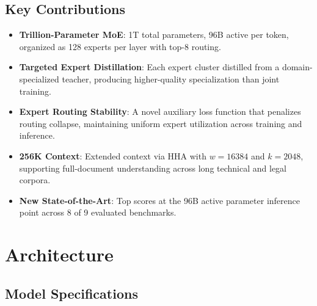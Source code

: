 \documentclass[11pt,a4paper]{article}
\begin{document}
\subsection{Key Contributions}

\begin{itemize}
    \item \textbf{Trillion-Parameter MoE}: 1T total parameters, 96B active per token,
    organized as 128 experts per layer with top-8 routing.
    \item \textbf{Targeted Expert Distillation}: Each expert cluster distilled from a
    domain-specialized teacher, producing higher-quality specialization than joint training.
    \item \textbf{Expert Routing Stability}: A novel auxiliary loss function that penalizes
    routing collapse, maintaining uniform expert utilization across training and inference.
    \item \textbf{256K Context}: Extended context via HHA with $w = 16384$ and $k = 2048$,
    supporting full-document understanding across long technical and legal corpora.
    \item \textbf{New State-of-the-Art}: Top scores at the 96B active parameter inference
    point across 8 of 9 evaluated benchmarks.
\end{itemize}

\section{Architecture}

\subsection{Model Specifications}
\end{document}
